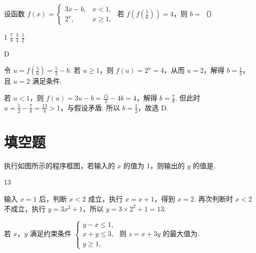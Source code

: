 \begin{problem}
设函数 \( f(x) = \begin{cases}
3x - b, & x < 1,\\
2^x, & x \geqslant 1,
\end{cases} \) 若 \( f\left(f\left(\frac{5}{6}\right)\right) = 4 \)，则 \( b = \)（\quad）

\choices
    {1}
    {\(\frac{7}{8}\)}
    {\(\frac{3}{4}\)}
    {\(\frac{1}{2}\)}
\end{problem}

\begin{answer}
D
\end{answer}

\begin{solution}
令 \(u=f\left(\frac56\right)=\frac52-b\). 若 \(u\geqslant1\)，则
\(f(u)=2^u=4\)，从而 \(u=2\)，解得 \(b=\frac12\)，且 \(u=2\) 满足条件.

若 \(u<1\)，则 \(f(u)=3u-b=\frac{15}{2}-4b=4\)，解得 \(b=\frac78\). 但此时 \(u=\frac52-\frac78=\frac{13}{8}>1\)，与假设矛盾. 所以 \(b=\frac12\)，故选 D.
\end{solution}

\section{填空题}

\begin{problem}
执行如图所示的程序框图，若输入的 \(x\) 的值为 1，则输出的 \(y\) 的值是\fillinblank{}.
\end{problem}

\begin{answer}
13
\end{answer}

\begin{solution}
输入 \(x=1\) 后，判断 \(x<2\) 成立，执行 \(x=x+1\)，得到 \(x=2\). 再次判断时 \(x<2\) 不成立，执行 \(y=3x^2+1\)，所以
\(y=3\times2^2+1=13\).
\end{solution}

\begin{problem}
若 \(x\)，\(y\) 满足约束条件 \(\begin{cases}
y - x \leqslant 1,\\
x + y \leqslant 3,\\
y \geqslant 1,
\end{cases}\) 则 \(z = x + 3y\) 的最大值为\fillinblank{}.
\end{problem}

